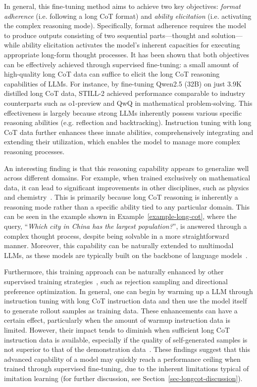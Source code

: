 In general, this fine-tuning method aims to achieve two key objectives: \emph{format adherence} (i.e. following a long CoT  format) and \emph{ability elicitation} (i.e. activating the complex reasoning mode). Specifically, format adherence requires the model to produce outputs consisting of two sequential parts—thought and solution—while ability elicitation activates the model's inherent capacities for executing appropriate long-form thought processes. It has been shown that both objectives can be effectively achieved through supervised fine-tuning: a small amount of high-quality long CoT data can suffice to elicit the long CoT reasoning capabilities of LLMs. For instance, by fine-tuning Qwen2.5 (32B) on just 3.9K distilled long CoT data, STILL-2 \cite{Min-arxiv-2024-Imitate} achieved performance comparable to industry counterparts such as o1-preview and QwQ in mathematical problem-solving. This effectiveness is largely because strong LLMs inherently possess various specific reasoning abilities (e.g. reflection and backtracking). Instruction tuning with long CoT data further enhances these innate abilities, comprehensively integrating and extending their utilization, which enables the model to manage more complex reasoning processes. 

An interesting finding is that this reasoning capability appears to generalize well across different domains. For example, when trained exclusively on mathematical data, it can lead to significant improvements in other disciplines, such as physics and chemistry~\cite{Min-arxiv-2024-Imitate}. This is primarily because long CoT reasoning is inherently a reasoning mode rather than a specific ability tied to any particular domain. This can be seen in the example shown in Example~\ref{example-long-cot}, where the query, ``\emph{Which city in China has the largest population?}'', is answered through a  complex thought process, despite being solvable in a more straightforward manner. Moreover, this capability can be naturally extended to multimodal LLMs, as these models are typically built on the backbone of language models~\cite{Du-arxiv-2025-Virgo}. 

Furthermore, this training approach can be naturally enhanced by other supervised training strategies~\cite{Min-arxiv-2024-Imitate}, such as rejection sampling and directional preference optimization. In general, one can begin by warming up a LLM through instruction tuning with long CoT instruction data and then use the model itself to generate rollout samples as training data. These enhancements can have a certain effect, particularly when the amount of warmup instruction data is limited. However, their impact tends to diminish when sufficient long CoT instruction data is available, especially if the quality of self-generated samples is not superior to that of the demonstration data~\cite{Min-arxiv-2024-Imitate}. These findings suggest that this advanced capability of a model may quickly reach a performance ceiling when trained through supervised fine-tuning, due to the inherent limitations typical of imitation learning (for further discussion, see Section~\ref{sec-longcot-discussion}). 

